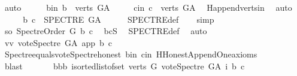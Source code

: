 \begin{isabellebody}
\ auto\isanewline
\ \ \isamarkupfalse%
\ \isamarkupfalse%
\ b{\isacharunderscore}{\kern0pt}in{}{\isacharcolon}{\kern0pt}\ {\isachardoublequoteopen}b\ {\isasymin}\ verts\ G{\isacharunderscore}{\kern0pt}A{\isachardoublequoteclose}\isanewline
\ \ \ \ \ c{\isacharunderscore}{\kern0pt}in{}{\isacharcolon}{\kern0pt}\ {\isachardoublequoteopen}c\ {\isasymin}\ verts\ G{\isacharunderscore}{\kern0pt}A{\isachardoublequoteclose}\ \isamarkupfalse%
\ H{}{\isachardot}{\kern0pt}append{\isacharunderscore}{\kern0pt}verts{\isacharunderscore}{\kern0pt}in\ \isamarkupfalse%
\ auto\isanewline
\ \ \isamarkupfalse%
\ \isamarkupfalse%
\ {\isachardoublequoteopen}{\isacharparenleft}{\kern0pt}b{\isacharcomma}{\kern0pt}\ c{\isacharparenright}{\kern0pt}\ {\isasymin}\ SPECTRE\ G{\isacharunderscore}{\kern0pt}A{\isachardoublequoteclose}\isanewline
\ \ \ \ \isamarkupfalse%
\ SPECTRE{\isacharunderscore}{\kern0pt}def\ \isanewline
\ \ \isamarkupfalse%
{\isacharparenleft}{\kern0pt}simp{\isacharparenright}{\kern0pt}\isanewline
\ \ \ \ \isamarkupfalse%
\ so{\isacharcolon}{\kern0pt}\ {\isachardoublequoteopen}Spectre{\isacharunderscore}{\kern0pt}Order\ G\ b\ c{\isachardoublequoteclose}\ \isamarkupfalse%
\ bcS\ \isamarkupfalse%
\ SPECTRE{\isacharunderscore}{\kern0pt}def\ \isamarkupfalse%
\ auto\isanewline
\ \ \ \ \isamarkupfalse%
\ \isamarkupfalse%
\ vv{\isacharcolon}{\kern0pt}\ {\isachardoublequoteopen}vote{\isacharunderscore}{\kern0pt}Spectre\ G{\isacharunderscore}{\kern0pt}A\ app\ b\ c\ {\isacharequal}{\kern0pt}\ {}{\isachardoublequoteclose}\isanewline
\ \ \ \ \ \ \isamarkupfalse%
\ Spectre{\isacharunderscore}{\kern0pt}equals{\isacharunderscore}{\kern0pt}vote{\isacharunderscore}{\kern0pt}Spectre{\isacharunderscore}{\kern0pt}honest\ b{\isacharunderscore}{\kern0pt}in\ c{\isacharunderscore}{\kern0pt}in\ H{}{\isachardot}{\kern0pt}Honest{\isacharunderscore}{\kern0pt}Append{\isacharunderscore}{\kern0pt}One{\isacharunderscore}{\kern0pt}axioms\isanewline
\ \ \ \ \ \ \isamarkupfalse%
\ blast\ \isanewline
\ \ \ \ \isamarkupfalse%
\ bbb{\isacharcolon}{\kern0pt}\ {\isachardoublequoteopen}{\isacharparenleft}{\kern0pt}{\isasymSum}i{\isasymleftarrow}sorted{\isacharunderscore}{\kern0pt}list{\isacharunderscore}{\kern0pt}of{\isacharunderscore}{\kern0pt}set\ {\isacharparenleft}{\kern0pt}verts\ G{\isacharparenright}{\kern0pt}{\isachardot}{\kern0pt}\ vote{\isacharunderscore}{\kern0pt}Spectre\ G{\isacharunderscore}{\kern0pt}A\ i\ b\ c{\isacharparenright}{\kern0pt}\ {\isacharequal}{\kern0pt}\isanewline

\end{isabellebody}
